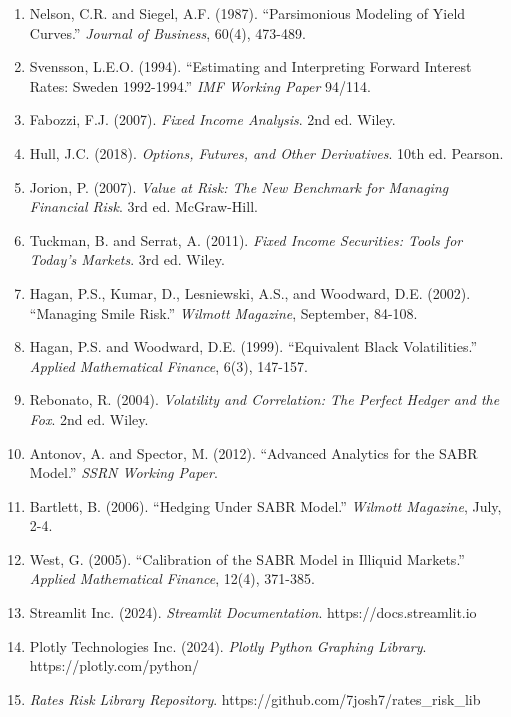 \documentclass[12pt,a4paper]{report}
\begin{document}
\begin{enumerate}
    \item Nelson, C.R. and Siegel, A.F. (1987). ``Parsimonious Modeling of Yield Curves.'' \textit{Journal of Business}, 60(4), 473-489.
    
    \item Svensson, L.E.O. (1994). ``Estimating and Interpreting Forward Interest Rates: Sweden 1992-1994.'' \textit{IMF Working Paper} 94/114.
    
    \item Fabozzi, F.J. (2007). \textit{Fixed Income Analysis}. 2nd ed. Wiley.
    
    \item Hull, J.C. (2018). \textit{Options, Futures, and Other Derivatives}. 10th ed. Pearson.
    
    \item Jorion, P. (2007). \textit{Value at Risk: The New Benchmark for Managing Financial Risk}. 3rd ed. McGraw-Hill.
    
    \item Tuckman, B. and Serrat, A. (2011). \textit{Fixed Income Securities: Tools for Today's Markets}. 3rd ed. Wiley.
    
    \item Hagan, P.S., Kumar, D., Lesniewski, A.S., and Woodward, D.E. (2002). ``Managing Smile Risk.'' \textit{Wilmott Magazine}, September, 84-108.
    
    \item Hagan, P.S. and Woodward, D.E. (1999). ``Equivalent Black Volatilities.'' \textit{Applied Mathematical Finance}, 6(3), 147-157.
    
    \item Rebonato, R. (2004). \textit{Volatility and Correlation: The Perfect Hedger and the Fox}. 2nd ed. Wiley.
    
    \item Antonov, A. and Spector, M. (2012). ``Advanced Analytics for the SABR Model.'' \textit{SSRN Working Paper}.
    
    \item Bartlett, B. (2006). ``Hedging Under SABR Model.'' \textit{Wilmott Magazine}, July, 2-4.
    
    \item West, G. (2005). ``Calibration of the SABR Model in Illiquid Markets.'' \textit{Applied Mathematical Finance}, 12(4), 371-385.
    
    \item Streamlit Inc. (2024). \textit{Streamlit Documentation}. https://docs.streamlit.io
    
    \item Plotly Technologies Inc. (2024). \textit{Plotly Python Graphing Library}. https://plotly.com/python/
    
    \item \textit{Rates Risk Library Repository}. https://github.com/7josh7/rates\_risk\_lib
\end{enumerate}
\end{document}
